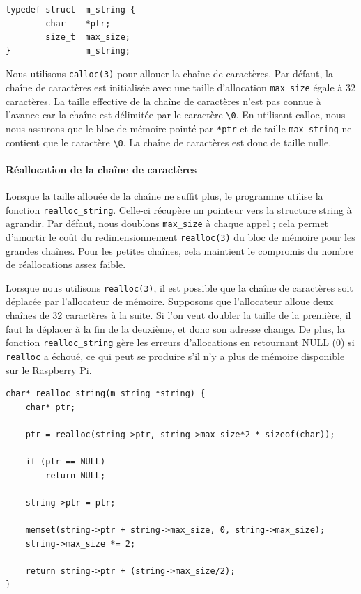 \documentclass[a4paper,11pt]{article}
\begin{document}
\begin{verbatim}
typedef struct  m_string {
        char    *ptr;
        size_t  max_size;
}               m_string;
\end{verbatim}

Nous utilisons \texttt{calloc(3)} pour allouer la chaîne de caractères. Par défaut, la chaîne de caractères est initialisée avec une taille d'allocation \texttt{max\_size} égale à $32$ caractères. La taille effective de la chaîne de caractères n'est pas connue à l'avance car la chaîne est délimitée par le caractère \texttt{\textbackslash 0}. En utilisant calloc, nous nous assurons que le bloc de mémoire pointé par \texttt{*ptr} et de taille \texttt{max\_string} ne contient que le caractère \texttt{\textbackslash 0}. La chaîne de caractères est donc de taille nulle.

\paragraph*{Réallocation de la chaîne de caractères}

Lorsque la taille allouée de la chaîne ne suffit plus, le programme utilise la fonction \texttt{realloc\_string}. Celle-ci récupère un pointeur vers la structure string à agrandir. Par défaut, nous doublons \texttt{max\_size} à chaque appel ; cela permet d'amortir le coût du redimensionnement \texttt{realloc(3)} du bloc de mémoire pour les grandes chaînes. Pour les petites chaînes, cela maintient le compromis du nombre de réallocations assez faible.

Lorsque nous utilisons \texttt{realloc(3)}, il est possible que la chaîne de caractères soit déplacée par l'allocateur de mémoire. Supposons que l'allocateur alloue deux chaînes de 32 caractères à la suite. Si l'on veut doubler la taille de la première, il faut la déplacer à la fin de la deuxième, et donc son adresse change. De plus, la fonction \texttt{realloc\_string} gère les erreurs d'allocations en retournant NULL (0) si \texttt{realloc} a échoué, ce qui peut se produire s'il n'y a plus de mémoire disponible sur le Raspberry Pi.

\begin{verbatim}
char* realloc_string(m_string *string) {
    char* ptr;

    ptr = realloc(string->ptr, string->max_size*2 * sizeof(char));

    if (ptr == NULL)
        return NULL;

    string->ptr = ptr;

    memset(string->ptr + string->max_size, 0, string->max_size);
    string->max_size *= 2;

    return string->ptr + (string->max_size/2);
}
\end{verbatim}
\end{document}
